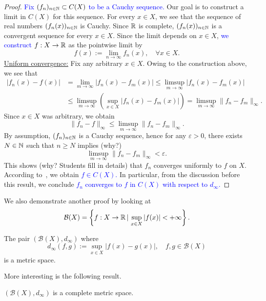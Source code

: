 \begin{proof}
	\textcolor{blue}{Fix $(f_n)_{n\in\mathbb{N}}\subset C(X)$ to be a Cauchy sequence.} Our goal is to construct a limit in $C(X)$ for this sequence. For every $x \in X$, we see that the sequence of real numbers $(f_n(x))_{n\in\mathbb{N}}$ is Cauchy. Since $\mathbb{R}$ is complete, $(f_n(x))_{n\in\mathbb{N}}$ is a convergent sequence for every $x\in X$. Since the limit depends on $x\in X$, \textcolor{blue}{we construct $f:X\to \mathbb{R}$} as the pointwise limit by
	\[
	f(x) := \lim_{n\to \infty}f_n(x),\quad \forall x \in X.
	\]
	\ul{Uniform convergence:} Fix any arbitrary $x\in X$. Owing to the construction above, we see that
	\begin{align*}
	|f_n(x) - f(x)| &= \lim_{m\to \infty}|f_n(x) - f_m(x)| \le \limsup_{m\to \infty} |f_n(x) - f_m(x)| \\
	&\le\limsup_{m\to \infty} \left(\sup_{x\in X}|f_n(x) - f_m(x)|\right) = \limsup_{m\to \infty}\|f_n-f_m\|_\infty.
	\end{align*}
	Since $x\in X$ was arbitrary, we obtain
	\[
	\|f_n-f\|_\infty \le \limsup_{m\to \infty}\|f_n-f_m\|_\infty.
	\]
	By assumption, $(f_n)_{n\in\mathbb{N}}$ is a Cauchy sequence, hence for any $\varepsilon>0$, there exists $N\in \mathbb{N}$ such that $n\ge N$ implies (why?)
	\[
	\limsup_{m\to\infty}\|f_n-f_m\|_\infty < \varepsilon.
	\]
	This shows (why? Students fill in details) that $f_n$ converges uniformly to $f$ on $X$. According to~, we obtain \textcolor{blue}{$f \in C(X)$.} In particular, from the discussion before this result, we conclude \textcolor{blue}{$f_n$ converges to $f$ in $C(X)$ with respect to $d_\infty$.}
\end{proof}
We also demonstrate another proof by looking at
\[
\mathcal{B}(X) = \left\{f:X\to \mathbb{R} \, | \, \sup_{x\in X}|f(x)| < +\infty\right\}.
\]
\begin{ex}
The pair $(\mathcal{B}(X),d_\infty)$ where
\[
d_\infty(f,g) := \sup_{x\in X}|f(x)-g(x)|,\quad f,g\in \mathcal{B}(X)
\]
is a metric space.
\end{ex}
More interesting is the following result.
\begin{prop}
\label{prop:B_comp}
$(\mathcal{B}(X),d_\infty)$ is a complete metric space.
\end{prop}
